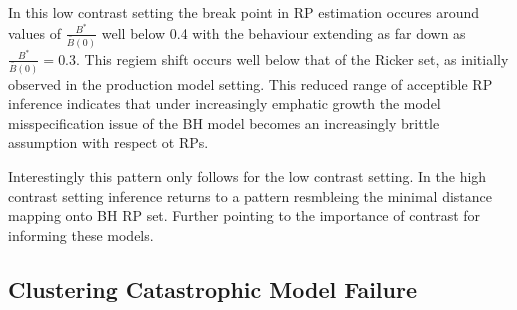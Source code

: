 %
In this low contrast setting the break point in RP estimation occures around values of 
$\frac{B^*}{\bar B(0)}$ well below 0.4 with the behaviour extending as far down as 
$\frac{B^*}{\bar B(0)}=0.3$. This regiem shift occurs well below that of the Ricker 
set, as initially observed in the production model setting. 
This reduced range of acceptible RP inference indicates that under increasingly 
emphatic growth 
the model misspecification issue of the BH model becomes an 
increasingly brittle assumption with respect ot RPs.

%
Interestingly this pattern only follows for the low contrast setting. In the high 
contrast setting inference returns to a pattern resmbleing the minimal distance 
mapping onto BH RP set. Further pointing to the importance of contrast for informing
these models.



%

%

%
\subsection{Clustering Catastrophic Model Failure}


